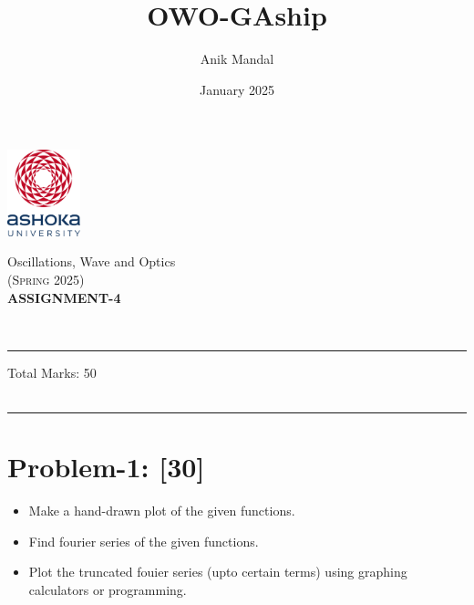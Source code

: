 \documentclass[12pt, a4paper]{article}
\title{OWO-GAship}
\author{Anik Mandal}
\date{January 2025}
\begin{document}
\begin{minipage}[t][][c]{0.1\textwidth}
    \begin{flushleft}
        \includegraphics[height=2.5cm]{tex-resources/Ashoka Logo.png}
    \end{flushleft}
\end{minipage}
\begin{minipage}[t][][c]{0.85\textwidth}
    \begin{center}
        {\LARGE Oscillations, Wave and Optics}\\ \vspace{0.5em}
        \textsc{(Spring 2025)}\\
        \vspace{1em}
        \textbf{\Large ASSIGNMENT-4} \\
    \end{center}
\end{minipage}
\vspace{10pt}\\
\rule[0em]{\textwidth}{0.75pt}

\hfill 
Total Marks: 50   \\
\hfill
{}\\
\vspace{.2cm}
\rule[0em]{\textwidth}{1.75pt}
\vspace{-1cm}
\justifying

\section*{Problem-1: \hfill \textbf{[30]}}
\begin{itemize}
    \item Make a hand-drawn plot of the given functions.
    \item Find fourier series of the given functions.
    \item Plot the truncated fouier series (upto certain terms) using graphing calculators 
    or programming.
\end{itemize}
\end{document}
